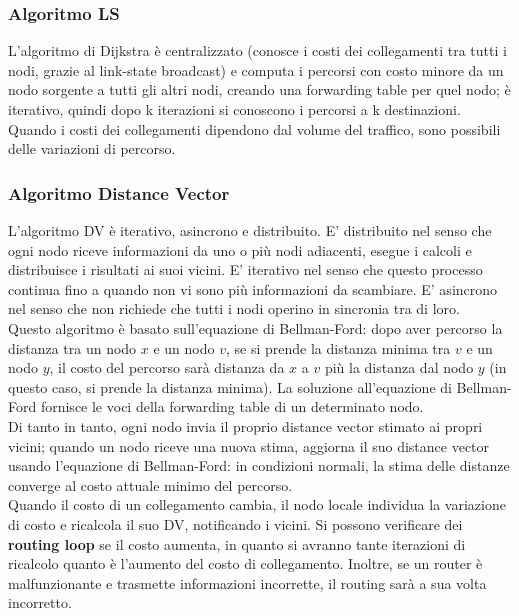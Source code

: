 \documentclass[11pt]{article}
\begin{document}
\subsubsection{Algoritmo LS} 
L'algoritmo di Dijkstra è centralizzato (conosce i costi dei collegamenti tra tutti i nodi, grazie al link-state broadcast) 
e computa i percorsi con costo minore da un nodo sorgente a tutti gli altri nodi, creando una forwarding table per quel 
nodo; è iterativo, quindi dopo k iterazioni si conoscono i percorsi a k destinazioni. Quando i costi dei collegamenti 
dipendono dal volume del traffico, sono possibili delle variazioni di percorso.
\subsubsection{Algoritmo Distance Vector}
L'algoritmo DV è iterativo, asincrono e distribuito. E' distribuito nel senso che ogni nodo riceve informazioni da uno o 
più nodi adiacenti, esegue i calcoli e distribuisce i risultati ai suoi vicini. E' iterativo nel senso che questo processo 
continua fino a quando non vi sono più informazioni da scambiare. E' asincrono nel senso che non richiede che tutti i nodi 
operino in sincronia tra di loro.\\
Questo algoritmo è basato sull'equazione di Bellman-Ford: dopo aver percorso la distanza tra un nodo $x$ e un nodo $v$, 
se si prende la distanza minima tra $v$ e un nodo $y$, il costo del percorso sarà distanza da $x$ a $v$ più la distanza 
dal nodo $y$ (in questo caso, si prende la distanza minima). La soluzione all'equazione di Bellman-Ford fornisce le voci 
della forwarding table di un determinato nodo.\\
Di tanto in tanto, ogni nodo invia il proprio distance vector stimato ai propri vicini; quando un nodo riceve una nuova 
stima, aggiorna il suo distance vector usando l'equazione di Bellman-Ford: in condizioni normali, la stima delle distanze 
converge al costo attuale minimo del percorso.\\
Quando il costo di un collegamento cambia, il nodo locale individua la variazione di costo e ricalcola il suo DV, notificando 
i vicini. Si possono verificare dei \textbf{routing loop} se il costo aumenta, in quanto si avranno tante iterazioni di 
ricalcolo quanto è l'aumento del costo di collegamento. Inoltre, se un router è malfunzionante e trasmette informazioni 
incorrette, il routing sarà a sua volta incorretto.
\end{document}
